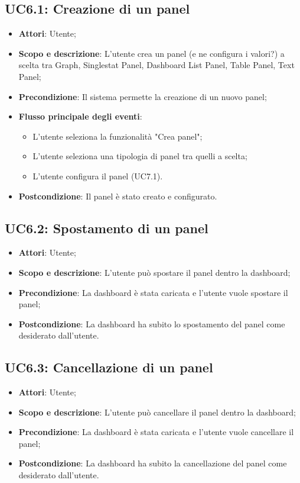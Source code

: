 \subsection{UC6.1: Creazione di un panel}
\hypertarget{UC6.1}{}
\begin{itemize}
	\item \textbf{Attori}: Utente;
	\item \textbf{Scopo e descrizione}: L'utente crea un panel (e ne configura i valori?) a scelta tra Graph, Singlestat Panel, Dashboard List Panel, Table Panel, Text Panel;
	\item \textbf{Precondizione}: Il sistema permette la creazione di un nuovo panel;
	\item \textbf{Flusso principale degli eventi}:
	\begin{itemize}
		\item L'utente seleziona la funzionalità "Crea panel";
		\item L'utente seleziona una tipologia di panel tra quelli a scelta;
		\item L'utente configura il panel (UC7.1).
	\end{itemize}
	\item \textbf{Postcondizione}: Il panel è stato creato e configurato.
\end{itemize}
\subsection{UC6.2: Spostamento di un panel}
\hypertarget{UC6.2}{}
\begin{itemize}
	\item \textbf{Attori}: Utente;
	\item \textbf{Scopo e descrizione}: L'utente può spostare il panel dentro la dashboard;
	\item \textbf{Precondizione}: La dashboard è stata caricata e l'utente vuole spostare il panel;
	\item \textbf{Postcondizione}: La dashboard ha subito lo spostamento del panel come desiderato dall'utente.
\end{itemize}
\subsection{UC6.3: Cancellazione di un panel}
\hypertarget{UC6.3}{}
\begin{itemize}
	\item \textbf{Attori}: Utente;
	\item \textbf{Scopo e descrizione}: L'utente può cancellare il panel dentro la dashboard;
	\item \textbf{Precondizione}: La dashboard è stata caricata e l'utente vuole cancellare il panel;
	\item \textbf{Postcondizione}: La dashboard ha subito la cancellazione del panel come desiderato dall'utente.
\end{itemize}
